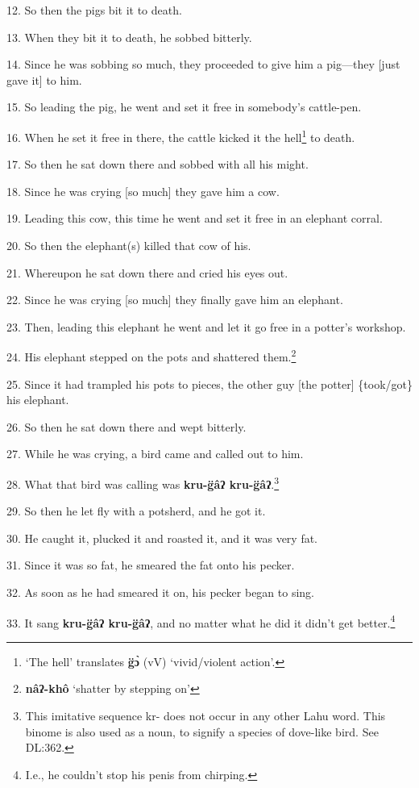 12. So then the pigs bit it to death.

13. When they bit it to death, he sobbed bitterly.

14. Since he was sobbing so much, they proceeded to give him a pig---they [just
gave it] to him.

15. So leading the pig, he went and set it free in somebody's cattle-pen.

16. When he set it free in there, the cattle kicked it the hell\footnote{`The hell' translates \textbf{g̈ɔ̀} (vV) `vivid/violent action'.} to death.

17. So then he sat down there and sobbed with all his might.

18. Since he was crying [so much] they gave him a cow.

19. Leading this cow, this time he went and set it free in an elephant corral.

20. So then the elephant(s) killed that cow of his.

21. Whereupon he sat down there and cried his eyes out.

22. Since he was crying [so much] they finally gave him an elephant.

23. Then, leading this elephant he went and let it go free in a potter's workshop.

24. His elephant stepped on the pots and shattered them.\footnote{\textbf{nâʔ-khô} `shatter by stepping on'}

25. Since it had trampled his pots to pieces, the other guy [the potter] \{took/got\}
his elephant.

26. So then he sat down there and wept bitterly.

27. While he was crying, a bird came and called out to him.

28. What that bird was calling was \textbf{kru-g̈âʔ kru-g̈âʔ}.\footnote{This imitative sequence kr- does not occur in any other Lahu word. This binome is also used as a noun, to signify a species of dove-like bird. See DL:362.}

29. So then he let fly with a potsherd, and he got it.

30. He caught it, plucked it and roasted it, and it was very fat.

31. Since it was so fat, he smeared the fat onto his pecker.

32. As soon as he had smeared it on, his pecker began to sing.

33. It sang \textbf{kru-g̈âʔ kru-g̈âʔ}, and no matter what he did it didn't
get better.\footnote{I.e., he couldn't stop his penis from chirping.}

